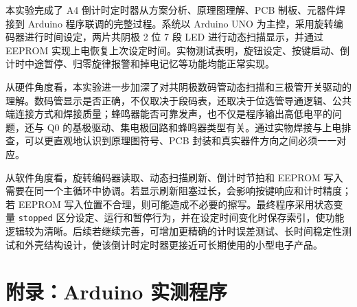 \documentclass[UTF8,a4paper,12pt]{ctexart}
\newcounter{makepart}
\begin{document}

本实验完成了 A4 倒计时定时器从方案分析、原理图理解、PCB 制板、元器件焊接到 Arduino 程序联调的完整过程。系统以 Arduino UNO 为主控，采用旋转编码器进行时间设定，两片共阴极 2 位 7 段 LED 进行动态扫描显示，并通过 EEPROM 实现上电恢复上次设定时间。实物测试表明，旋钮设定、按键启动、倒计时中途暂停、归零旋律报警和掉电记忆等功能均能正常实现。

从硬件角度看，本实验进一步加深了对共阴极数码管动态扫描和三极管开关驱动的理解。数码管显示是否正确，不仅取决于段码表，还取决于位选管导通逻辑、公共端连接方式和焊接质量；蜂鸣器能否可靠发声，也不仅是程序输出高低电平的问题，还与 Q0 的基极驱动、集电极回路和蜂鸣器类型有关。通过实物焊接与上电排查，可以更直观地认识到原理图符号、PCB 封装和真实器件方向之间必须一一对应。

从软件角度看，旋转编码器读取、动态扫描刷新、倒计时节拍和 EEPROM 写入需要在同一个主循环中协调。若显示刷新阻塞过长，会影响按键响应和计时精度；若 EEPROM 写入位置不合理，则可能造成不必要的擦写。最终程序采用状态变量 \texttt{stopped} 区分设定、运行和暂停行为，并在设定时间变化时保存索引，使功能逻辑较为清晰。后续若继续完善，可增加更精确的计时误差测试、长时间稳定性测试和外壳结构设计，使该倒计时定时器更接近可长期使用的小型电子产品。

\clearpage
\appendix
\section*{附录：Arduino 实测程序}


\end{document}
